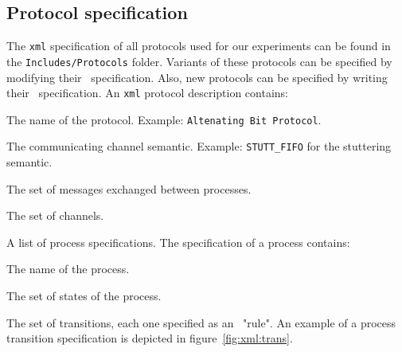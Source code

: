 \subsection*{Protocol specification}

The \texttt{xml} specification of all protocols used for our experiments can be found in the \texttt{Includes/Protocols} folder.
%
Variants of these protocols can be specified by modifying their \xml\ specification.
Also, new protocols can be specified by writing their \xml\ specification.
%
An \texttt{xml} protocol description contains:
\begin{inparaenum}
\item The name of the protocol. Example: \texttt{Altenating Bit Protocol}.
\item The communicating channel semantic. Example: \texttt{STUTT\_FIFO} for the stuttering semantic.
\item The set of messages exchanged between processes.
\item The set of channels.
\item A list of process specifications. The specification of a process contains:
\begin{inparaenum}
\item The name of the process.
\item The set of states of the process.
\item The set of transitions, each one specified as an \Xml\ "rule". An example of a process transition specification is depicted in figure~\ref{fig:xml:trans}.
\end{inparaenum}
\end{inparaenum}

